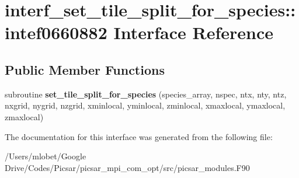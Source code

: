 \hypertarget{interfaceinterf__set__tile__split__for__species_1_1intef0660882}{}\section{interf\+\_\+set\+\_\+tile\+\_\+split\+\_\+for\+\_\+species\+:\+:intef0660882 Interface Reference}
\label{interfaceinterf__set__tile__split__for__species_1_1intef0660882}
\subsection*{Public Member Functions}
\begin{DoxyCompactItemize}
\item 
subroutine {\bfseries set\+\_\+tile\+\_\+split\+\_\+for\+\_\+species} (species\+\_\+array, nspec, ntx, nty, ntz, nxgrid, nygrid, nzgrid, xminlocal, yminlocal, zminlocal, xmaxlocal, ymaxlocal, zmaxlocal)\hypertarget{interfaceinterf__set__tile__split__for__species_1_1intef0660882_a4d1ab45e484a461fa161d8b5a0c5f283}{}\label{interfaceinterf__set__tile__split__for__species_1_1intef0660882_a4d1ab45e484a461fa161d8b5a0c5f283}

\end{DoxyCompactItemize}


The documentation for this interface was generated from the following file\+:\begin{DoxyCompactItemize}
\item 
/\+Users/mlobet/\+Google Drive/\+Codes/\+Picsar/picsar\+\_\+mpi\+\_\+com\+\_\+opt/src/picsar\+\_\+modules.\+F90\end{DoxyCompactItemize}
